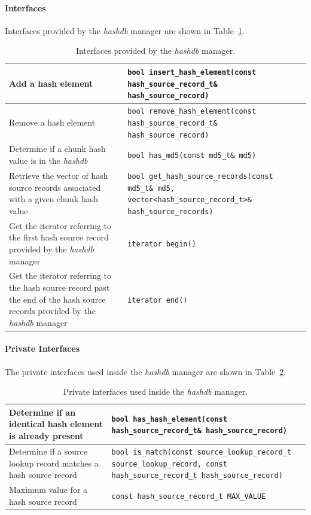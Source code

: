 \documentclass[12pt,twoside]{article}
\newcommand{\hdb}{\emph{hashdb}\xspace}
\begin{document}
\paragraph{Interfaces}
Interfaces provided by the \hdb manager are shown in Table~\ref{hashdb-manager-interfaces}.
\begin{table}[h]
\center
\begin{tabular}{|p{2in}|p{4in}|}
\hline
Add a hash element & \texttt{bool insert\_hash\_element(const hash\_source\_record\_t\& hash\_source\_record)} \\
\hline
Remove a hash element & \texttt{bool remove\_hash\_element(const hash\_source\_record\_t\& hash\_source\_record)} \\
\hline
Determine if a chunk hash value is in the \hdb & \texttt{bool has\_md5(const md5\_t\& md5)} \\
\hline
Retrieve the vector of hash source records associated with a given chunk hash value & \texttt{bool get\_hash\_source\_records(const md5\_t\& md5, vector\textless hash\_source\_record\_t\textgreater\& hash\_source\_records)} \\
\hline
Get the iterator referring to the first hash source record provided by the \hdb manager & \texttt{iterator begin()} \\
\hline
Get the iterator referring to the hash source record past the end of the hash source records provided by the \hdb manager & \texttt{iterator end()} \\
\hline
\end{tabular}
\caption{Interfaces provided by the \hdb manager.\label{hashdb-manager-interfaces}}
\end{table}

\paragraph{Private Interfaces}
The private interfaces used inside the \hdb manager
are shown in Table~\ref{hashdb-manager-private-interfaces}.
\begin{table}[h]
\center
\begin{tabular}{|p{2in}|p{4in}|}
\hline
Determine if an identical hash element is already present & \texttt{bool has\_hash\_element(const hash\_source\_record\_t\& hash\_source\_record)} \\
\hline
Determine if a source lookup record matches a hash source record & \texttt{bool is\_match(const source\_lookup\_record\_t source\_lookup\_record, const hash\_source\_record\_t hash\_source\_record)} \\
\hline
Maximum value for a hash source record & \texttt{const hash\_source\_record\_t MAX\_VALUE} \\
\hline
\end{tabular}
\caption{Private interfaces used inside the \hdb manager.\label{hashdb-manager-private-interfaces}}
\end{table}
\end{document}
